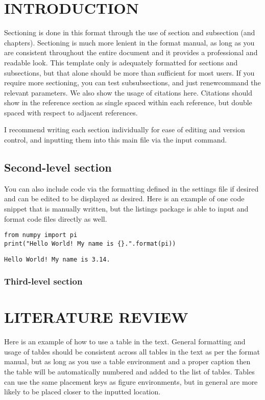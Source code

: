 \begin{body}

\chapter{INTRODUCTION}
Sectioning is done in this format through the use of section and subsection (and chapters). Sectioning is much more lenient in the format manual, as long as you are consistent throughout the entire document and it provides a professional and readable look. This template only is adequately formatted for sections and subsections, but that alone should be more than sufficient for most users. If you require more sectioning, you can test subsubsections, and just renewcommand the relevant parameters. We also show the usage of citations here. Citations should show in the reference section as single spaced within each reference, but double spaced with respect to adjacent references.  \cite{loudonQuantumTheoryLight2000,suterPhysicsLaseratomInteractions1997, weinerLightmatterInteractionPhysics2017}

I recommend writing each section individually for ease of editing and version control, and inputting them into this main file via the input command.

\section{Second-level section}
You can also include code via the formatting defined in the settings file if desired and can be edited to be displayed as desired. Here is an example of one code snippet that is manually written, but the listings package is able to input and format code files directly as well.
\begin{lstlisting}
from numpy import pi
print("Hello World! My name is {}.".format(pi))
\end{lstlisting}
\verb|Hello World! My name is 3.14.|
\subsection{Third-level section}
\lipsum[1]


\chapter{LITERATURE REVIEW}
Here is an example of how to use a table in the text. General formatting and usage of tables should be consistent across all tables in the text as per the format manual, but as long as you use a table environment and a proper caption then the table will be automatically numbered and added to the list of tables. Tables can use the same placement keys as figure environments, but in general are more likely to be placed closer to the inputted location. 


\end{body}
